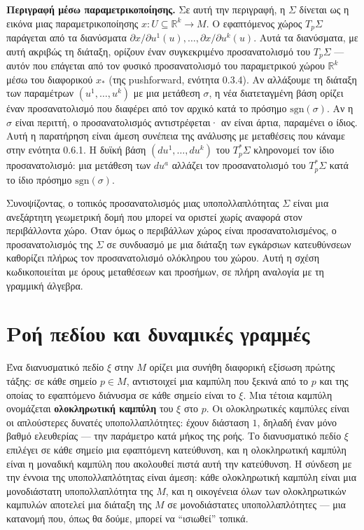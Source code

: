 \documentclass[11pt,a4paper,twoside,openright]{book}
\begin{document}
\textbf{Περιγραφή μέσω παραμετρικοποίησης.} Σε αυτή την περιγραφή, η $\Sigma$ δίνεται ως η εικόνα μιας παραμετρικοποίησης $x: U \subseteq \mathbb{R}^k \to M$. Ο εφαπτόμενος χώρος $T_p\Sigma$ παράγεται από τα διανύσματα $\partial x / \partial u^1(u), \dots, \partial x / \partial u^k(u)$. Αυτά τα διανύσματα, με αυτή ακριβώς τη διάταξη, ορίζουν έναν συγκεκριμένο προσανατολισμό του $T_p\Sigma$ --- αυτόν που επάγεται από τον φυσικό προσανατολισμό του παραμετρικού χώρου $\mathbb{R}^k$ μέσω του διαφορικού $x_*$ (της pushforward, ενότητα 0.3.4). Αν αλλάξουμε τη διάταξη των παραμέτρων $(u^1, \dots, u^k)$ με μια μετάθεση $\sigma$, η νέα διατεταγμένη βάση ορίζει έναν προσανατολισμό που διαφέρει από τον αρχικό κατά το πρόσημο $\text{sgn}(\sigma)$. Αν η $\sigma$ είναι περιττή, ο προσανατολισμός αντιστρέφεται· αν είναι άρτια, παραμένει ο ίδιος. Αυτή η παρατήρηση είναι άμεση συνέπεια της ανάλυσης με μεταθέσεις που κάναμε στην ενότητα 0.6.1. Η δυϊκή βάση $(du^1, \dots, du^k)$ του $T_p^*\Sigma$ κληρονομεί τον ίδιο προσανατολισμό: μια μετάθεση των $du^a$ αλλάζει τον προσανατολισμό του $T_p^*\Sigma$ κατά το ίδιο πρόσημο $\text{sgn}(\sigma)$.

Συνοψίζοντας, ο τοπικός προσανατολισμός μιας υποπολλαπλότητας $\Sigma$ είναι μια ανεξάρτητη γεωμετρική δομή που μπορεί να οριστεί χωρίς αναφορά στον περιβάλλοντα χώρο. Όταν όμως ο περιβάλλων χώρος είναι προσανατολισμένος, ο προσανατολισμός της $\Sigma$ σε συνδυασμό με μια διάταξη των εγκάρσιων κατευθύνσεων καθορίζει πλήρως τον προσανατολισμό ολόκληρου του χώρου. Αυτή η σχέση κωδικοποιείται με όρους μεταθέσεων και προσήμων, σε πλήρη αναλογία με τη γραμμική άλγεβρα.

\section{Ροή πεδίου και δυναμικές γραμμές}

Ένα διανυσματικό πεδίο $\xi$ στην $M$ ορίζει μια συνήθη διαφορική εξίσωση πρώτης τάξης: σε κάθε σημείο $p \in M$, αντιστοιχεί μια καμπύλη που ξεκινά από το $p$ και της οποίας το εφαπτόμενο διάνυσμα σε κάθε σημείο είναι το $\xi$. Μια τέτοια καμπύλη ονομάζεται \textbf{ολοκληρωτική καμπύλη} του $\xi$ στο $p$. Οι ολοκληρωτικές καμπύλες είναι οι απλούστερες δυνατές υποπολλαπλότητες: έχουν διάσταση $1$, δηλαδή έναν μόνο βαθμό ελευθερίας --- την παράμετρο κατά μήκος της ροής. Το διανυσματικό πεδίο $\xi$ επιλέγει σε κάθε σημείο μια εφαπτόμενη κατεύθυνση, και η ολοκληρωτική καμπύλη είναι η μοναδική καμπύλη που ακολουθεί πιστά αυτή την κατεύθυνση. Η σύνδεση με την έννοια της υποπολλαπλότητας είναι άμεση: κάθε ολοκληρωτική καμπύλη είναι μια μονοδιάστατη υποπολλαπλότητα της $M$, και η οικογένεια όλων των ολοκληρωτικών καμπυλών αποτελεί μια διάταξη της $M$ σε μονοδιάστατες υποπολλαπλότητες --- μια κατανομή που, όπως θα δούμε, μπορεί να ``ισιωθεί'' τοπικά.
\end{document}
